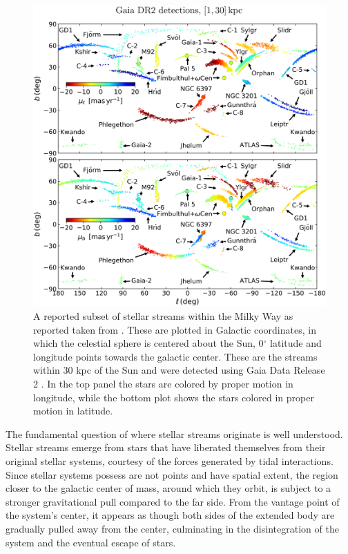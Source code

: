 \begin{figure}
    \centering
    \includegraphics[width=\linewidth]{images/ibata-2021.jpeg}
    \caption{A reported subset of stellar streams within the Milky Way as reported taken from \citet{2021ApJ...914..123I}. These are plotted in Galactic coordinates, in which the celestial sphere is centered about the Sun, 0$^{\circ}$ latitude and longitude points towards the galactic center. These are the streams within 30 kpc of the Sun and were detected using Gaia Data Release 2 \citep{2018A&A...616A...1G}. In the top panel the stars are colored by proper motion in longitude, while the bottom plot shows the stars colored in proper motion in latitude.}
    \label{fig:ibata-2021}
\end{figure}

The fundamental question of where stellar streams originate is well understood. Stellar streams emerge from stars that have liberated themselves from their original stellar systems, courtesy of the forces generated by tidal interactions. Since stellar systems possess are not points and have spatial extent, the region closer to the galactic center of mass, around which they orbit, is subject to a stronger gravitational pull compared to the far side. From the vantage point of the system's center, it appears as though both sides of the extended body are gradually pulled away from the center, culminating in the disintegration of the system and the eventual escape of stars.

